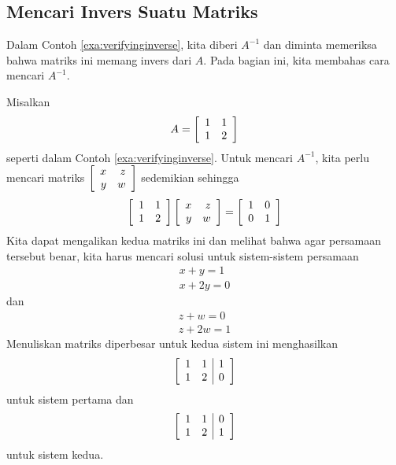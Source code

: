 
\subsection{Mencari Invers Suatu Matriks}

Dalam Contoh \ref{exa:verifyinginverse}, kita diberi $A^{-1}$ dan diminta memeriksa bahwa matriks ini
memang invers dari $A$. Pada bagian ini, kita membahas cara mencari $A^{-1}$. 

Misalkan
\begin{equation*}
A=\left[
\begin{array}{rr}
1 & 1 \\
1 & 2
\end{array}
\right]
\end{equation*}
seperti dalam Contoh \ref{exa:verifyinginverse}.
Untuk mencari $A^{-1}$, kita perlu mencari
matriks $\left[
\begin{array}{rr}
x & z \\
y & w
\end{array}
\right] $ sedemikian sehingga
\begin{equation*}
\left[
\begin{array}{rr}
1 & 1 \\
1 & 2
\end{array}
\right] \left[
\begin{array}{rr}
x & z \\
y & w
\end{array}
\right] =\left[
\begin{array}{rr}
1 & 0 \\
0 & 1
\end{array}
\right] 
\end{equation*}
Kita dapat mengalikan kedua matriks ini dan melihat bahwa agar persamaan tersebut benar, kita harus mencari solusi untuk sistem-sistem persamaan
\begin{equation*}
\begin{array}{c}
x+y=1 \\
x+2y=0
\end{array}
\end{equation*}
dan
\begin{equation*}
\begin{array}{c}
z+w=0 \\
z+2w=1
\end{array}
\end{equation*}
Menuliskan matriks diperbesar untuk kedua sistem ini menghasilkan
\begin{equation*}
\left[
\begin{array}{rr|r}
1 & 1 & 1 \\
1 & 2 & 0
\end{array}
\right]  
\label{inverse1a}
\end{equation*}
untuk sistem pertama dan
\begin{equation}
\left[
\begin{array}{rr|r}
1 & 1 & 0 \\
1 & 2 & 1
\end{array}
\right]  \label{inverse2a}
\end{equation}
untuk sistem kedua. 

